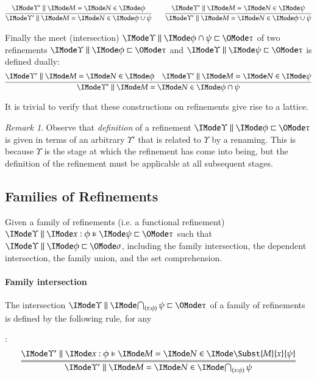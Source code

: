 \documentclass[11pt]{article}
\theoremstyle{definition}
\theoremstyle{notation}
\theoremstyle{remark}
\newtheorem{remark}[thm]{Remark}
\numberwithin{equation}{section}
\begin{document}
\begin{gather*}
  \infer{
    \RMemEq{\Upsilon'}{M}{N}{\phi\cup\psi}
  }{
    \RMemEq{\Upsilon'}{M}{N}{\phi}
  }\qquad
  \infer{
    \RMemEq{\Upsilon'}{M}{N}{\phi\cup\psi}
  }{
    \RMemEq{\Upsilon'}{M}{N}{\psi}
  }
\end{gather*}

Finally the meet (intersection) $\Refines{\Upsilon}{\phi\cap\psi}{\tau}$ of two refinements
$\Refines{\Upsilon}{\phi}{\tau}$ and $\Refines{\Upsilon}{\psi}{\tau}$ is defined
dually:
\[
  \infer{
    \RMemEq{\Upsilon'}{M}{N}{\phi\cap\psi}
  }{
    \RMemEq{\Upsilon'}{M}{N}{\phi} &
    \RMemEq{\Upsilon'}{M}{N}{\psi}
  }
\]

It is trivial to verify that these constructions on refinements give rise to a
lattice.

\begin{remark}
  Observe that \emph{definition} of a refinement
  $\Refines{\Upsilon}{\phi}{\tau}$ is given in terms of an arbitrary
  $\Upsilon'$ that is related to $\Upsilon$ by a renaming. This is because
  $\Upsilon$ is the stage at which the refinement has come into being, but the
  definition of the refinement must be applicable at all subsequent stages.
\end{remark}

\subsection{Families of Refinements}

Given a family of refinements (i.e. a functional refinement)
$\FRefines{\Upsilon}{x:\phi}{\psi}{\tau}$ such that
$\Refines{\Upsilon}{\phi}{\sigma}$, including the family intersection, the
dependent intersection, the family union, and the set comprehension.

\paragraph{Family intersection}
The intersection $\Refines{\Upsilon}{\bigcap_{(x:\phi)}\psi}{\tau}$ of a family
of refinements is defined by the following rule, for any
:
\[
  \infer={
    \RMemEq{\Upsilon'}{M}{N}{
      \bigcap_{(x:\phi)}\psi
    }
  }{
    \FRMemEq{\Upsilon'}{x:\phi}{M}{N}{\Subst{M}{x}{\psi}}
  }
\]
\end{document}
